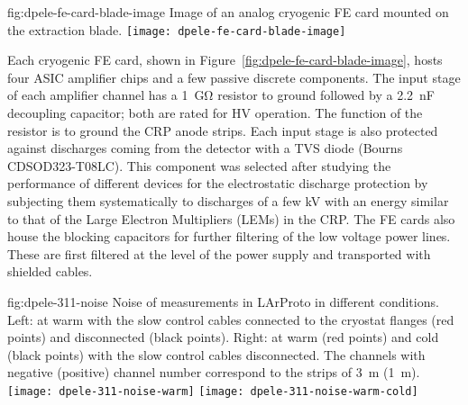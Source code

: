 \begin{dunefigure}{fig:dpele-fe-card-blade-image}
{Image of an analog cryogenic FE card mounted on the extraction blade.}
\texttt{[image: dpele-fe-card-blade-image]}
\end{dunefigure}

Each cryogenic FE card, shown in Figure~\ref{fig:dpele-fe-card-blade-image}, hosts four ASIC amplifier chips and a few passive discrete components. The input stage of each amplifier channel has a \SI{1}{\giga\ohm} resistor to ground followed by a \SI{2.2}{\nano\farad} decoupling capacitor; both are rated for HV operation. The function of the resistor is to ground the CRP anode strips. Each input stage is also protected against discharges coming from the detector with a TVS diode (Bourns CDSOD323-T08LC). This component was selected after studying the performance of different devices for the electrostatic discharge protection by subjecting them systematically to discharges of a few kV with an energy similar to that of the Large Electron Multipliers (LEMs) in the CRP. The FE cards also house the blocking capacitors for further filtering of the low voltage power lines. These are first filtered at the level of the power supply and transported with shielded cables.

\begin{dunefigure}{fig:dpele-311-noise}
{Noise of measurements in LArProto in different conditions. Left: at warm with the slow control cables connected to the cryostat flanges (red points) and disconnected (black points). Right: at warm (red points) and cold (black points) with the slow control cables disconnected. The channels with negative (positive) channel number correspond to the strips of \SI{3}{\meter} (\SI{1}{\meter}).}
\texttt{[image: dpele-311-noise-warm]}
\texttt{[image: dpele-311-noise-warm-cold]}
\end{dunefigure}

